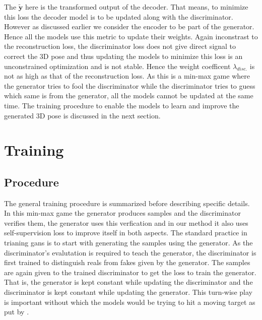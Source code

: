 The $\tilde{\textbf{y}}$ here is the transformed output of the decoder. That means, to minimize this loss the decoder model is to be updated along with the discriminator. However as discussed earlier we consider the encoder to be part of the generator. Hence all the models use this metric to update their weights. Again inconstrast to the reconstruction loss, the discriminator loss does not give direct signal to correct the 3D pose and thus updating the models to minimize this loss is an unconstrained optimization and is not stable. Hence the weight coefficent $\lambda_{disc.}$ is not as high as that of the reconstruction loss. As this is a min-max game where the generator tries to fool the discriminator while the discriminator tries to guess which same is from the generator, all the models cannot be updated at the same time. The training procedure to enable the models to learn and improve the generated 3D pose is discussed in the next section.


\section{Training}

\subsection{Procedure}
The general training procedure is summarized before describing specific details. In this min-max game the generator produces samples and the discriminator verifies them, the generator uses this verfication and in our method it also uses self-supervision loss to improve itself in both aspects. The standard practice in trianing \acp{gan} is to start with generating the samples using the generator. As the discriminator's evalutation is required to teach the generator, the discriminator is first trained to distinguish reals from fakes given by the generator. The samples are again given to the trained discriminator to get the loss to train the generator. That is, the generator is kept constant while updating the discriminator and the discriminator is kept constant while updating the generator. This turn-wise play is important without which the models would be trying to hit a moving target as put by \cite{gan_training_google}.


